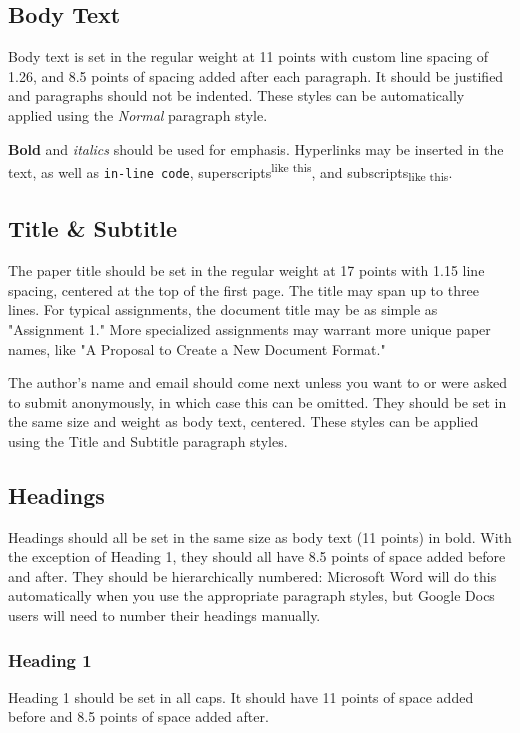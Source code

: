 \documentclass[11pt,a4paper,usenames,dvipsnames]{article}
\begin{document}
\subsection{Body Text}
Body text is set in the regular weight at 11 points with custom line spacing of 1.26, and 8.5 points of spacing added after each paragraph. It should be justified and paragraphs should not be indented. These styles can be automatically applied using the \textit{Normal} paragraph style.

\textbf{Bold} and \textit{italics} should be used for emphasis. Hyperlinks may be inserted in the text, as well as \lstinline{in-line code}, superscripts\textsuperscript{like this}, and subscripts\textsubscript{like this}.

\subsection{Title \& Subtitle}
The paper title should be set in the regular weight at 17 points with 1.15 line spacing, centered at the top of the first page. The title may span up to three lines. For typical assignments, the document title may be as simple as "Assignment 1." More specialized assignments may warrant more unique paper names, like "A Proposal to Create a New Document Format."

The author's name and email should come next unless you want to or were asked to submit anonymously, in which case this can be omitted. They should be set in the same size and weight as body text, centered. These styles can be applied using the Title and Subtitle paragraph styles.

\subsection{Headings}
Headings should all be set in the same size as body text (11 points) in bold. With the exception of Heading 1, they should all have 8.5 points of space added before and after. They should be hierarchically numbered: Microsoft Word will do this automatically when you use the appropriate paragraph styles, but Google Docs users will need to number their headings manually.

\subsubsection{Heading 1}
Heading 1 should be set in all caps. It should have 11 points of space added before and 8.5 points of space added after.
\end{document}
